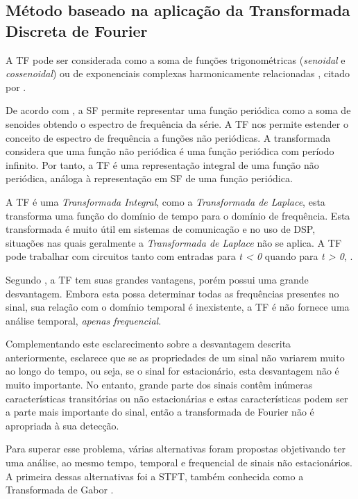 \subsection{Método baseado na aplicação da Transformada Discreta de Fourier}
\par
A \acl{TF} pode ser considerada como a soma de funções trigonométricas (\emph{senoidal} e\emph{ cossenoidal}) ou de exponenciais complexas harmonicamente relacionadas \citep{KAG09}, citado por \citep{BAC11}.
\par
De acordo com \cite{SAD03}, a \ac{SF} permite representar uma função periódica como a soma de senoides obtendo o espectro de frequência da série. A \ac{TF} nos permite estender o conceito de espectro de frequência a funções não periódicas. A transformada considera que uma função não periódica é uma função periódica com período infinito. Por tanto, a \ac{TF} é uma representação integral de uma função não periódica, análoga à representação em \ac{SF} de uma função periódica.
\par
A \acl{TF} é uma \emph{Transformada Integral}, como a \emph{Transformada de Laplace}, esta transforma uma função do domínio de tempo para o domínio de frequência. Esta transformada é muito útil em sistemas de comunicação e no uso de \ac{DSP}, situações nas quais geralmente a \emph{Transformada de Laplace} não se aplica. A \ac{TF} pode trabalhar com circuitos tanto com entradas para \emph{t < 0} quando para \emph{t > 0}, \citep{SAD03}.
\par
Segundo \cite{OLI07}, a \ac{TF} tem suas grandes vantagens, porém possui uma grande desvantagem. Embora esta possa determinar todas as frequências presentes no sinal, sua relação com o domínio temporal é inexistente, a \ac{TF} é não fornece uma análise temporal, \emph{apenas frequencial}.
\par
Complementando este esclarecimento sobre a desvantagem descrita anteriormente, \cite{MEN08} esclarece que se as propriedades de um sinal não variarem muito ao longo do tempo, ou seja, se o sinal for estacionário, esta desvantagem não é muito importante. No entanto, grande parte dos sinais contêm inúmeras características transitórias ou não estacionárias e estas características podem ser a parte mais importante do sinal, então a transformada de Fourier não é apropriada à sua detecção. 
\par
Para superar esse problema, várias alternativas foram propostas objetivando ter uma análise, ao mesmo tempo, temporal e frequencial de sinais não estacionários. A primeira dessas alternativas foi a \ac{STFT}, também conhecida como a Transformada de Gabor \citep{OLI07}.

